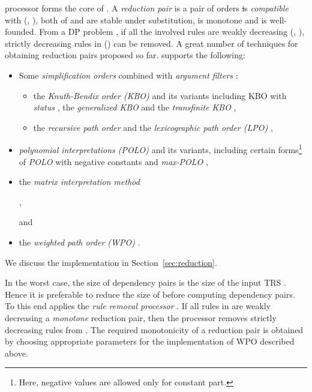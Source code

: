 \documentclass{llncs}
\newif\iffullversion
\begin{document}
 processor forms the core of \NaTT.
	A \emph{reduction pair} is a pair  of orders \st
	 is \emph{compatible} with  
	(\ie, ),
	both of  and  are stable under substitution,
	 is monotone and  is well-founded.
	From a DP problem ,
	if all the involved rules are weakly decreasing
	(\ie, ),
	strictly decreasing rules in  (\wrt ) can be removed.
	A great number of techniques for obtaining reduction pairs  proposed so far.
	\NaTT supports the following:
\begin{itemize}
\item
	Some \emph{simplification orders} combined with \emph{argument filters} \cite{AG00}:
\vspace{2pt}
\begin{itemize}
\item
	the \emph{Knuth-Bendix order (KBO)} \cite{KB70} and its variants including
	KBO with \emph{status} \cite{S89},
	the \emph{generalized KBO} \cite{MZ97} and
	the \emph{transfinite KBO} \cite{LW07,WZM12},
\vspace{2pt}
\item
	the \emph{recursive path order} \cite{D82}
	and the \emph{lexicographic path order (LPO)} \cite{KL80},
\end{itemize}
\vspace{4pt}
\item
	\emph{polynomial interpretations (POLO)} \cite{L79,AG00}
	and its variants,
	including certain forms\footnote{Here, negative values are allowed only for constant part.} of
	\emph{POLO} with negative constants \cite{HM04b} and
	\emph{max-POLO} \cite{FGMSTZ08},
\vspace{2pt}
\item the \emph{matrix interpretation method}
\iffullversion
	\cite{HW06,EWZ08},
\else
	\cite{EWZ08},
\fi
and
\vspace{2pt}
\item the \emph{weighted path order (WPO)} \cite{YKS13,YKS14}.
\end{itemize}
We discuss the implementation 
 in Section~\ref{sec:reduction}.

	In the worst case, the size of dependency pairs is
	the size of the input TRS .
	Hence it is preferable to reduce the size of  before
	computing dependency pairs.
	To this end \NaTT applies the \emph{rule removal processor} \cite{GTS04}.
	If all rules in  are weakly decreasing \wrt
	a \emph{monotone} reduction pair,
	then the processor removes strictly decreasing rules from .
	The required monotonicity of a reduction pair is obtained by choosing
	appropriate parameters for the implementation of WPO described above.
\end{document}
